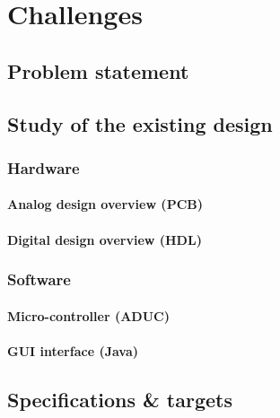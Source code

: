 \chapter{Challenges}
\section{Problem statement}
\section{Study of the existing design}
\subsection{Hardware}
\subsubsection{Analog design overview (PCB)}
\subsubsection{Digital design overview (HDL)}
\subsection{Software}
\subsubsection{Micro-controller (ADUC)}
\subsubsection{GUI interface (Java)}
\section{Specifications \& targets}